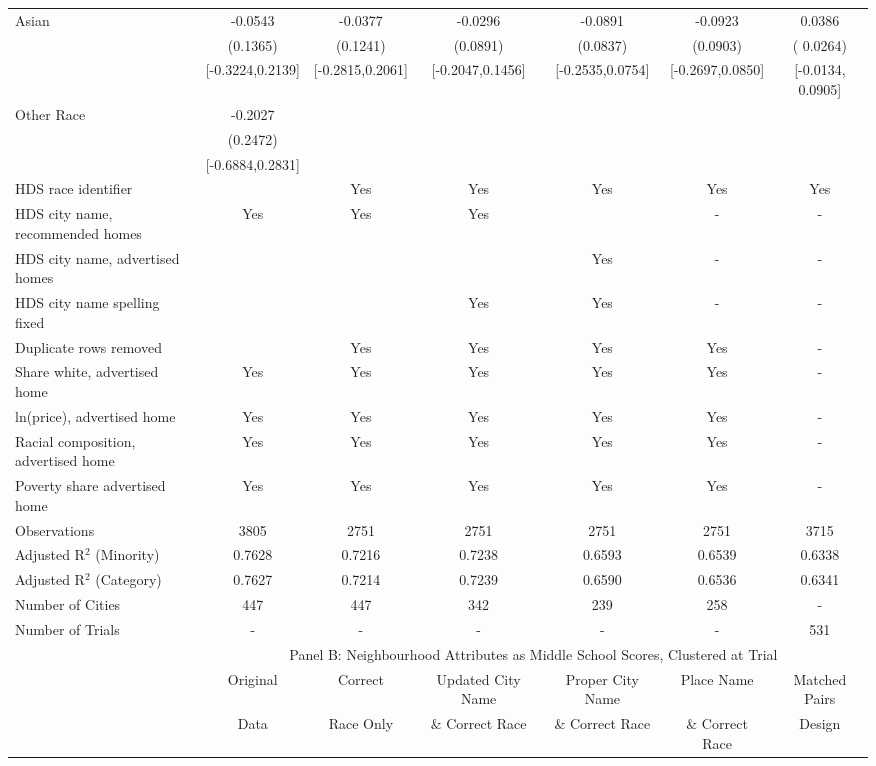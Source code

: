 \begin{table}[htbp]
{\begin{tabular}{l*{6}{c}}
Asian & -0.0543 & -0.0377 & -0.0296 & -0.0891 & -0.0923 & 0.0386 \\
 & (0.1365) & (0.1241) & (0.0891) & (0.0837) & (0.0903) & ( 0.0264) \\
 & [-0.3224,0.2139] & [-0.2815,0.2061] & [-0.2047,0.1456] & [-0.2535,0.0754] & [-0.2697,0.0850] & [-0.0134,  0.0905] \\
Other Race & -0.2027 &  &  &  &  &  \\
 & (0.2472) &  &  &  &  &  \\
 & [-0.6884,0.2831] &  &  &  &  &  \\
\midrule
HDS race identifier & & Yes & Yes & Yes & Yes & Yes \\
HDS city name, recommended homes & Yes & Yes & Yes & & - & -\\
HDS city name, advertised homes &  &  &  & Yes & - & -\\
HDS city name spelling fixed & & & Yes & Yes & - & -\\
Duplicate rows removed &  & Yes & Yes & Yes & Yes & - \\
\midrule
Share white, advertised home  & Yes & Yes & Yes & Yes & Yes & - \\
ln(price), advertised home  & Yes & Yes & Yes & Yes & Yes & - \\
Racial composition, advertised home & Yes & Yes & Yes & Yes & Yes & - \\
Poverty share advertised home & Yes & Yes & Yes & Yes & Yes & - \\
Observations & 3805 & 2751 & 2751 & 2751 & 2751 & 3715 \\
Adjusted R$^2$ (Minority) & 0.7628 & 0.7216 & 0.7238 & 0.6593 & 0.6539 & 0.6338 \\
Adjusted R$^2$ (Category) & 0.7627 & 0.7214 & 0.7239 & 0.6590 & 0.6536 & 0.6341 \\
Number of Cities & 447 & 447 & 342 & 239 & 258 & - \\
Number of Trials & - & - & - & - & - & 531 \\
\bottomrule
\toprule
& \multicolumn{6}{c}{Panel B: Neighbourhood Attributes as Middle School Scores, Clustered at Trial}\\
\toprule
                    &\multicolumn{1}{c}{Original}&\multicolumn{1}{c}{Correct}&\multicolumn{1}{c}{Updated City Name}&\multicolumn{1}{c}{Proper City Name}&\multicolumn{1}{c}{Place Name}&\multicolumn{1}{c}{Matched Pairs}\\
                      &\multicolumn{1}{c}{Data}&\multicolumn{1}{c}{Race Only}&\multicolumn{1}{c}{\& Correct Race}&\multicolumn{1}{c}{\& Correct Race}&\multicolumn{1}{c}{\& Correct Race}&\multicolumn{1}{c}{Design}\\                  

\end{tabular}}
\end{table}
